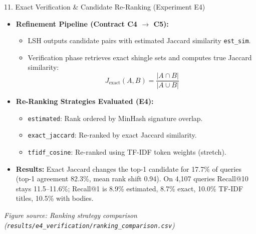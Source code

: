 \documentclass[aspectratio=169,10pt]{beamer}
\begin{document}
\begin{frame}[shrink=10]{11. Exact Verification \& Candidate Re-Ranking (Experiment E4)}
  \begin{itemize}
    \item \textbf{Refinement Pipeline (Contract C4 $\to$ C5):}
      \begin{itemize}
        \item LSH outputs candidate pairs with estimated Jaccard similarity \texttt{est\_sim}.
        \item Verification phase retrieves exact shingle sets and computes true Jaccard similarity:
          \[ J_{\text{exact}}(A, B) = \frac{|A \cap B|}{|A \cup B|} \]
      \end{itemize}
    \item \textbf{Re-Ranking Strategies Evaluated (E4):}
      \begin{itemize}
        \item \texttt{estimated}: Rank ordered by MinHash signature overlap.
        \item \texttt{exact\_jaccard}: Re-ranked by exact Jaccard similarity.
        \item \texttt{tfidf\_cosine}: Re-ranked using TF-IDF token weights (stretch).
      \end{itemize}
    \item \textbf{Results:} Exact Jaccard changes the top-1 candidate for 17.7\% of queries (top-1 agreement 82.3\%, mean rank shift 0.94). On 4,107 queries Recall@10 stays 11.5--11.6\%; Recall@1 is 8.9\% estimated, 8.7\% exact, 10.0\% TF-IDF titles, 10.5\% with bodies.
  \end{itemize}
  \vfill
  \footnotesize{\textit{Figure source: Ranking strategy comparison (\texttt{results/e4\_verification/ranking\_comparison.csv})}}
\end{frame}

\end{document}
